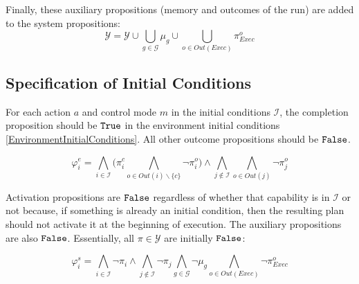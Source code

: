 Finally, these auxiliary propositions (memory and outcomes of the run) are added to the system propositions: $$\mathcal{Y} = \mathcal{Y} \cup \bigcup \limits_{g \in \mathcal{G}} \mu_g \cup \bigcup \limits_{o \in Out(Exec)} \pi_{Exec}^o$$


\subsection{Specification of Initial Conditions}

For each action $a$ and control mode $m$ in the initial conditions $\mathcal{I}$, the completion proposition should be $\mathtt{True}$ in the environment initial conditions \eqref{EnvironmentInitialConditions}.
All other outcome propositions should be $\mathtt{False}$.

\begin{equation}\label{EnvironmentInitialConditions}
	\varphi_i^e = \bigwedge \limits_{i \in \mathcal{I}} \Big( \pi_i^c \bigwedge \limits_{o \in Out(i)\backslash \{c\}} \lnot \pi_i^o \Big) \wedge \bigwedge \limits_{j \not\in \mathcal{I}} \bigwedge \limits_{o \in Out(j)} \lnot \pi_j^o
\end{equation}

Activation propositions are $\mathtt{False}$ regardless of whether that capability is in $\mathcal{I}$ or not because, if something is already an initial condition, then the resulting plan should not activate it at the beginning of execution.
The auxiliary propositions are also $\mathtt{False}$.
Essentially, all $\pi \in \mathcal{Y}$ are initially $\mathtt{False}$:

\begin{equation}\label{SystemInitialConditions}
	\varphi_i^s = \bigwedge \limits_{i \in \mathcal{I}} \lnot \pi_i \wedge \bigwedge \limits_{j \not \in \mathcal{I}} \lnot \pi_j \bigwedge \limits_{g \in \mathcal{G}} \lnot \mu_g \bigwedge \limits_{o \in Out(Exec)} \lnot \pi_{Exec}^{o}
\end{equation}

